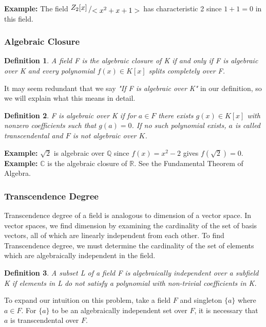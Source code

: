 \documentclass{article}
\newtheorem{defn}{Definition}
\newcommand{\bigslant}[2]{{\raisebox{.2em}{$#1$}\left/\raisebox{-.2em}{$#2$}\right.}}
\begin{document}
\noindent \textbf{Example:} The field $\bigslant{{Z}_{2}[x]}{<x^{2} + x + 1>}$ has characteristic 2 since $1 + 1 = 0$ in this field.

\subsubsection{Algebraic Closure}
\begin{defn}
    A field F is the algebraic closure of K if and only if F is algebraic over K and every polynomial $f(x)\in K[x]$ splits completely over F.
\end{defn}

It may seem redundant that we say \textit{"If F is algebraic over K"} in our definition, so we will explain what this means in detail. 
\begin{defn}
    F is algebraic over K if for $a \in F$ there exists $g(x) \in K[x]$ with nonzero coefficients such that $g(a) = 0$. If no such polynomial exists, $a$ is called transcendental and $F$ is not algebraic over $K$.
\end{defn}

\noindent \textbf{Example:} $\sqrt{2}$ is algebraic over $\mathbb{Q}$ since $f(x) = x^{2} -2$ gives $f(\sqrt{2}) = 0$.\\[.07in]

\noindent\textbf{Example:} $\mathbb{C}$ is the algebraic closure of $\mathbb{R}$. See the Fundamental Theorem of Algebra.

\subsubsection{Transcendence Degree} 
Transcendence degree of a field is analogous to dimension of a vector space. In vector spaces, we find dimension by examining the cardinality of the set of basis vectors, all of which are linearly independent from each other. To find Transcendence degree, we must determine the cardinality of the set of elements which are algebraically independent in the field.

\begin{defn}
    A subset L of a field F is algebraically independent over a subfield K if elements in L do not satisfy a polynomial with non-trivial coefficients in K.
\end{defn}

To expand our intuition on this problem, take a field $F$ and singleton $\{a\}$ where $a \in F$. For $\{a\}$ to be an algebraically independent set over $F$, it is necessary that $a$ is transcendental over $F$. \\[.07in]
\end{document}
